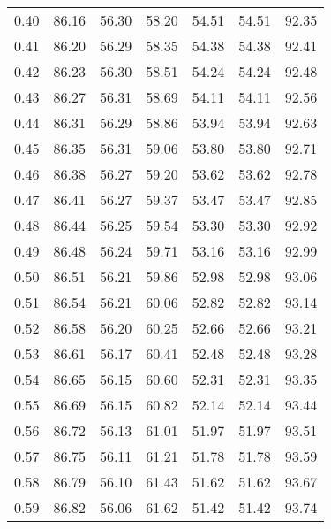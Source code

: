 \begin{tabular}{|c|c|c|c|c|c|c|}
      0.40 &     86.16 &     56.30 &      58.20 &   54.51 &      54.51 &         92.35 \\
      0.41 &     86.20 &     56.29 &      58.35 &   54.38 &      54.38 &         92.41 \\
      0.42 &     86.23 &     56.30 &      58.51 &   54.24 &      54.24 &         92.48 \\
      0.43 &     86.27 &     56.31 &      58.69 &   54.11 &      54.11 &         92.56 \\
      0.44 &     86.31 &     56.29 &      58.86 &   53.94 &      53.94 &         92.63 \\
      0.45 &     86.35 &     56.31 &      59.06 &   53.80 &      53.80 &         92.71 \\
      0.46 &     86.38 &     56.27 &      59.20 &   53.62 &      53.62 &         92.78 \\
      0.47 &     86.41 &     56.27 &      59.37 &   53.47 &      53.47 &         92.85 \\
      0.48 &     86.44 &     56.25 &      59.54 &   53.30 &      53.30 &         92.92 \\
      0.49 &     86.48 &     56.24 &      59.71 &   53.16 &      53.16 &         92.99 \\
      0.50 &     86.51 &     56.21 &      59.86 &   52.98 &      52.98 &         93.06 \\
      0.51 &     86.54 &     56.21 &      60.06 &   52.82 &      52.82 &         93.14 \\
      0.52 &     86.58 &     56.20 &      60.25 &   52.66 &      52.66 &         93.21 \\
      0.53 &     86.61 &     56.17 &      60.41 &   52.48 &      52.48 &         93.28 \\
      0.54 &     86.65 &     56.15 &      60.60 &   52.31 &      52.31 &         93.35 \\
      0.55 &     86.69 &     56.15 &      60.82 &   52.14 &      52.14 &         93.44 \\
      0.56 &     86.72 &     56.13 &      61.01 &   51.97 &      51.97 &         93.51 \\
      0.57 &     86.75 &     56.11 &      61.21 &   51.78 &      51.78 &         93.59 \\
      0.58 &     86.79 &     56.10 &      61.43 &   51.62 &      51.62 &         93.67 \\
      0.59 &     86.82 &     56.06 &      61.62 &   51.42 &      51.42 &         93.74 \\

\end{tabular}
